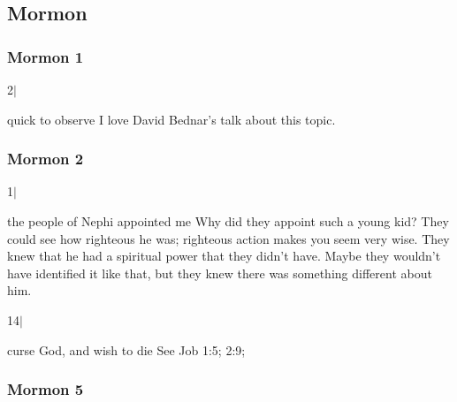 \subsection{Mormon} %

	\subsubsection{Mormon 1} %
	
		\begin{compactdesc}
		
		\item[2$\vert$]
		\begin{compactdesc}
		\item[quick to observe] I love David Bednar's talk about this topic.
		\end{compactdesc}
		
		\end{compactdesc}
		
	\subsubsection{Mormon 2} %
	
		\begin{compactdesc}
		
		\item[1$\vert$]
		\begin{compactdesc}
		\item[the people of Nephi appointed me] Why did they appoint such a young kid? They could see how righteous he was; righteous action makes you seem very wise. They knew that he had a spiritual power that they didn't have. Maybe they wouldn't have identified it like that, but they knew there was something different about him.
		\end{compactdesc}
		
		\item[14$\vert$]
		\begin{compactdesc}
		\item[curse God, and wish to die] See Job 1:5; 2:9;
		\end{compactdesc}
		
		\end{compactdesc}
		
	\subsubsection{Mormon 5} %
	
